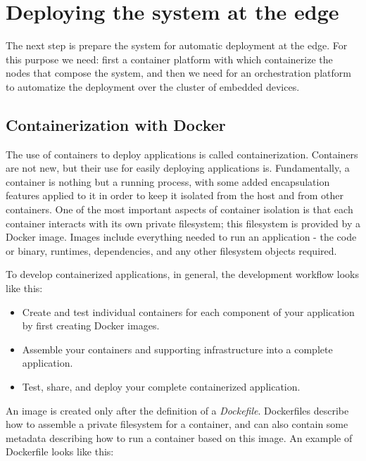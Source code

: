 \section{Deploying the system at the edge}
The next step is prepare the system for automatic deployment at the edge. For this purpose we need: first a container platform with which containerize the nodes that compose the system, and then we need for an orchestration platform to automatize the deployment over the cluster of embedded devices.

\subsection{Containerization with Docker}
The use of containers to deploy applications is called containerization. Containers are not new, but their use for easily deploying applications is.
Fundamentally, a container is nothing but a running process, with some added encapsulation features applied to it in order to keep it isolated from the host and from other containers. One of the most important aspects of container isolation is that each container interacts with its own private filesystem; this filesystem is provided by a Docker image. Images include everything needed to run an application - the code or binary, runtimes, dependencies, and any other filesystem objects required.

To develop containerized applications, in general, the development workflow looks like this:
\begin{itemize}
	\item Create and test individual containers for each component of your application by first creating Docker images.
	\item Assemble your containers and supporting infrastructure into a complete application.
	\item Test, share, and deploy your complete containerized application.
\end{itemize}

An image is created only after the definition of a \textit{Dockefile}. Dockerfiles describe how to assemble a private filesystem for a container, and can also contain some metadata describing how to run a container based on this image. An example of Dockerfile looks like this:

